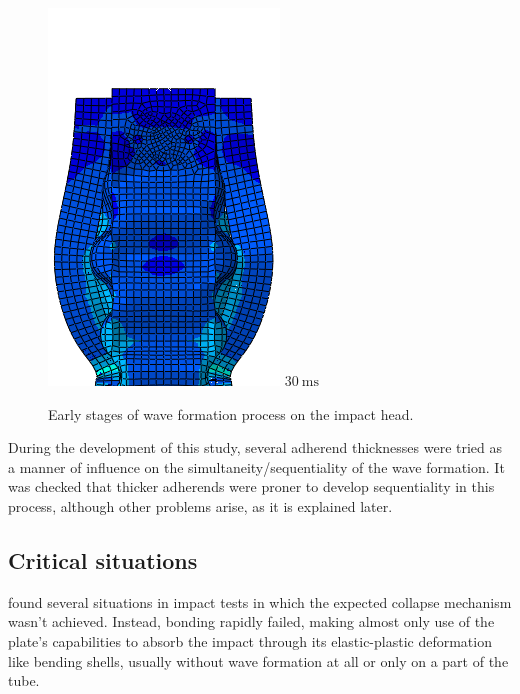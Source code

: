 \documentclass[
documentsize = a4, %
font = cmr, %
typesize = 11, %
printmode = true,
onehalfspacing = true,
language = en, %
titlepage = udciccp, %
degree = pt, %
dedication = true,
acknowledgements = true,
abstract-en = true,
abstract-es = false,
abstract-ga = false,
epigraphs = true,
toc = true,
lof = true,
lot = true,
frontmatterintoc = false,
notation = false,
minimal = false,
]{UDCthesis}
\begin{document}
\begin{figure}
\begin{minipage}[b]{.15\linewidth}
		\includegraphics[width=\linewidth]{IMG_CUTRES/c10}
		$\SI{30}{\ms}$
	\end{minipage}
\caption{Early stages of wave formation process on the impact head.}
\label{fig:wave_form}
\end{figure}

During the development of this study, several adherend thicknesses were tried as a manner of influence on the simultaneity/sequentiality of the wave formation. It was checked that thicker adherends were proner to develop sequentiality in this process, although other problems arise, as it is explained later.

\subsection{Critical situations}
\label{sec:critical_sits}
\citet{Peroni2009} found several situations in impact tests in which the expected collapse mechanism wasn't achieved. Instead, bonding rapidly failed, making almost only use of the plate's capabilities to absorb the impact through its elastic-plastic deformation like bending shells, usually without wave formation at all or only on a part of the tube.
\end{document}
